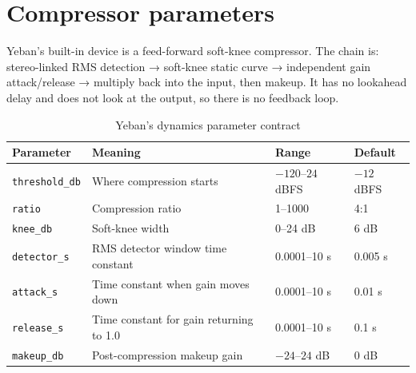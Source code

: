 \section{Compressor parameters}

Yeban's built-in device is a feed-forward soft-knee compressor. The chain is: stereo-linked RMS detection → soft-knee static curve → independent gain attack/release → multiply back into the input, then makeup. It has no lookahead delay and does not look at the output, so there is no feedback loop.

\begin{center}
\end{center}

\begin{table}[htbp]
\centering
\small
\begin{tabular}{@{}llll@{}}
\hline
Parameter & Meaning & Range & Default \\
\hline
\texttt{threshold\_db} & Where compression starts & $-120$–$24$ dBFS & $-12$ dBFS \\
\texttt{ratio} & Compression ratio & 1–1000 & 4:1 \\
\texttt{knee\_db} & Soft-knee width & 0–24 dB & 6 dB \\
\texttt{detector\_s} & RMS detector window time constant & 0.0001–10 s & 0.005 s \\
\texttt{attack\_s} & Time constant when gain moves down & 0.0001–10 s & 0.01 s \\
\texttt{release\_s} & Time constant for gain returning to 1.0 & 0.0001–10 s & 0.1 s \\
\texttt{makeup\_db} & Post-compression makeup gain & $-24$–$24$ dB & 0 dB \\
\hline
\end{tabular}
\caption{Yeban's dynamics parameter contract}
\label{tab:comp-params}
\end{table}

